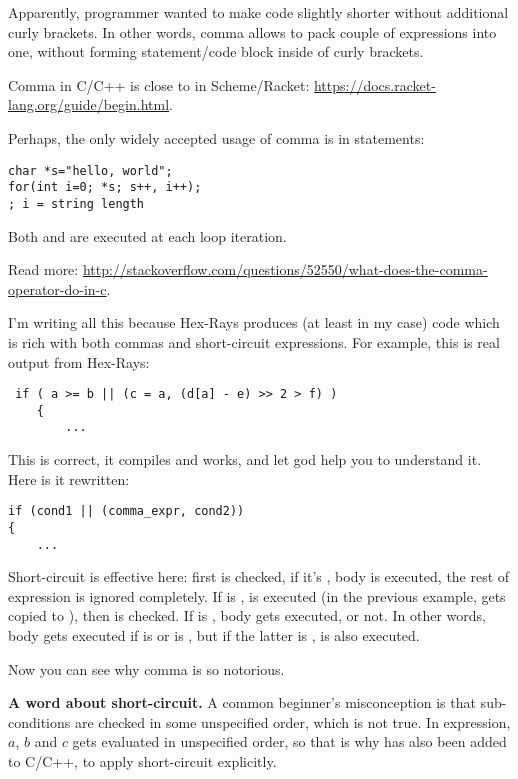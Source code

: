 Apparently, programmer wanted to make code slightly shorter without additional curly brackets.
In other words, comma allows to pack couple of expressions into one, without forming
statement/code block inside of curly brackets.

Comma in C/C++ is close to  in Scheme/Racket: \url{https://docs.racket-lang.org/guide/begin.html}.

Perhaps, the only widely accepted usage of comma is in  statements:

\begin{lstlisting}
char *s="hello, world";
for(int i=0; *s; s++, i++);
; i = string length
\end{lstlisting}

Both  and  are executed at each loop iteration.

Read more: \url{http://stackoverflow.com/questions/52550/what-does-the-comma-operator-do-in-c}.

I'm writing all this because Hex-Rays produces (at least in my case) code which is rich with both commas and short-circuit
expressions.
For example, this is real output from Hex-Rays:

\begin{lstlisting}
 if ( a >= b || (c = a, (d[a] - e) >> 2 > f) )
    {
    	...
\end{lstlisting}

This is correct, it compiles and works, and let god help you to understand it.
Here is it rewritten:

\begin{lstlisting}
if (cond1 || (comma_expr, cond2))
{
	...
\end{lstlisting}

Short-circuit is effective here: first  is checked, if it's ,  body is executed, the rest
of  expression is ignored completely.
If  is ,  is executed (in the previous example,  gets copied to ),
then  is checked.
If  is ,  body gets executed, or not.
In other words,  body gets executed if  is  or  is ,
but if the latter is ,  is also executed.

Now you can see why comma is so notorious.

\textbf{A word about short-circuit.}
A common beginner's misconception is that sub-conditions are checked in some unspecified order, which is not true.
In  expression, $a$, $b$ and $c$ gets evaluated in unspecified order, so that is why \TT{||} has also been
added to C/C++, to apply short-circuit explicitly.

